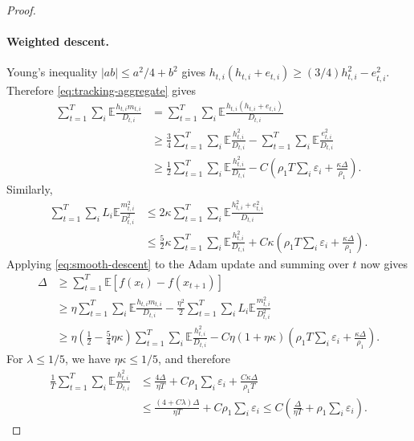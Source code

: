 \documentclass[11pt,letterpaper]{article}
\theoremstyle{definition}
\newcommand{\E}{\mathbb E}
\newcommand{\eps}{\varepsilon}
\begin{document}
\begin{proof}
\paragraph{Weighted descent.}
Young's inequality $|ab|\le a^2/4+b^2$ gives
$h_{t,i}(h_{t,i}+e_{t,i})\ge(3/4)h_{t,i}^2-e_{t,i}^2$.
Therefore \eqref{eq:tracking-aggregate} gives
\begin{align*}
\sum_{t=1}^T\sum_i\E\frac{h_{t,i}m_{t,i}}{D_{t,i}}
&=
\sum_{t=1}^T\sum_i
\E\frac{h_{t,i}(h_{t,i}+e_{t,i})}{D_{t,i}}\\
&\ge
\frac34\sum_{t=1}^T\sum_i
\E\frac{h_{t,i}^2}{D_{t,i}}
-\sum_{t=1}^T\sum_i
\E\frac{e_{t,i}^2}{D_{t,i}}\\
&\ge
\frac12\sum_{t=1}^T\sum_i
\E\frac{h_{t,i}^2}{D_{t,i}}
-C\left(
\rho_1T\sum_i\eps_i+\frac{\kappa\Delta}{\rho_1}
\right).
\end{align*}
Similarly,
\begin{align*}
\sum_{t=1}^T\sum_iL_i\E\frac{m_{t,i}^2}{D_{t,i}^2}
&\le
2\kappa\sum_{t=1}^T\sum_i
\E\frac{h_{t,i}^2+e_{t,i}^2}{D_{t,i}}\\
&\le
\frac52\kappa\sum_{t=1}^T\sum_i\E\frac{h_{t,i}^2}{D_{t,i}}
+C\kappa\left(\rho_1T\sum_i\eps_i+\frac{\kappa\Delta}{\rho_1}\right).
\end{align*}
Applying \eqref{eq:smooth-descent} to the Adam update and
summing over $t$ now gives
\begin{align*}
\Delta
&\ge
\sum_{t=1}^T\E[f(x_t)-f(x_{t+1})]\\
&\ge
\eta\sum_{t=1}^T\sum_i\E\frac{h_{t,i}m_{t,i}}{D_{t,i}}
-\frac{\eta^2}{2}\sum_{t=1}^T\sum_iL_i
\E\frac{m_{t,i}^2}{D_{t,i}^2}\\
&\ge
\eta\left(\frac12-\frac54\eta\kappa\right)
\sum_{t=1}^T\sum_i
\E\frac{h_{t,i}^2}{D_{t,i}}
-C\eta(1+\eta\kappa)\left(
\rho_1T\sum_i\eps_i+\frac{\kappa\Delta}{\rho_1}
\right).
\end{align*}
For $\lambda\le1/5$, we have $\eta\kappa\le1/5$, and therefore
\begin{equation}
\begin{aligned}
\frac1T\sum_{t=1}^T\sum_i
\E\frac{h_{t,i}^2}{D_{t,i}}
&\le\frac{4\Delta}{\eta T}
+C\rho_1\sum_i\eps_i+\frac{C\kappa\Delta}{\rho_1T}\\
&\le\frac{(4+C\lambda)\Delta}{\eta T}+C\rho_1\sum_i\eps_i
\le C\left(
\frac{\Delta}{\eta T}+\rho_1\sum_i\eps_i
\right).
\end{aligned}
\label{eq:adaptive-descent}
\end{equation}


\end{proof}
\end{document}
